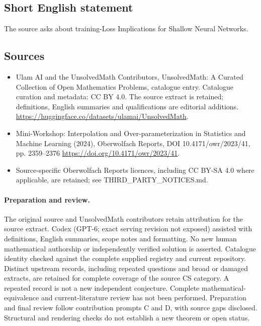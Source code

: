 \documentclass[11pt]{article}
\begin{document}
\subsection{Short English statement}
The source asks about training-Loss Implications for Shallow Neural Networks.
\subsection{Sources}
\begin{itemize}
\item[\hypertarget{source:statement:1}{S1}] Ulam AI and the UnsolvedMath Contributors, UnsolvedMath: A Curated Collection of Open Mathematics Problems, catalogue entry. Catalogue curation and metadata: CC BY 4.0. The source extract is retained; definitions, English summaries and qualifications are editorial additions.
\url{https://huggingface.co/datasets/ulamai/UnsolvedMath}.
\item[\hypertarget{source:statement:2}{S2}] Mini-Workshop: Interpolation and Over-parameterization in Statistics and Machine Learning​ (2024), Oberwolfach Reports, DOI 10.4171/owr/2023/41, pp. 2359--2376
\url{https://doi.org/10.4171/owr/2023/41}.
\item Source-specific Oberwolfach Reports licences, including CC BY-SA 4.0 where applicable, are retained; see THIRD\_PARTY\_NOTICES.md.
\end{itemize}
\paragraph{Preparation and review.}
The original source and UnsolvedMath contributors retain attribution for the source extract. Codex (GPT-6; exact serving revision not exposed) assisted with definitions, English summaries, scope notes and formatting. No new human mathematical authorship or independently verified solution is asserted. Catalogue identity checked against the complete supplied registry and current repository. Distinct upstream records, including repeated questions and broad or damaged extracts, are retained for complete coverage of the source CS category. A repeated record is not a new independent conjecture. Complete mathematical-equivalence and current-literature review has not been performed. Preparation and final review follow contribution prompts C and D, with source gaps disclosed. Structural and rendering checks do not establish a new theorem or open status.
\label{end:statement}
\end{document}
